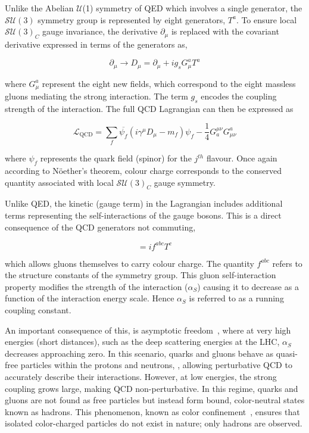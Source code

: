Unlike the Abelian $\mathcal{U}$(1) symmetry of QED which involves a single generator, the $\mathcal{SU}(3)$ symmetry group is represented by eight generators, $T^a$. To ensure local $\mathcal{SU}(3)_C$ gauge invariance, the derivative $\partial_\mu$ is replaced with the covariant derivative expressed in terms of the generators as,

\begin{equation}
    \partial_\mu \rightarrow D_\mu = \partial_\mu + ig_sG^{a}_{\mu}T^{a}
\end{equation}

where $G^{a}_{\mu}$ represent the eight new fields, which correspond to the eight massless gluons mediating the strong interaction. The term $g_s$ encodes the coupling strength of the interaction. The full QCD Lagrangian can then be expressed as

\begin{equation} 
\mathcal{L}_{\text{QCD}} = \sum_{f}\overline{\psi_f}(i\gamma^\mu D_\mu - m_f)\psi_f - \frac{1}{4} G^{\mu\nu}_{a}G^{a}_{\mu\nu}
\end{equation}

where $\psi_f$ represents the quark field (spinor) for the $j^{th}$ flavour. Once again according to N\"{o}ether's theorem, colour charge corresponds to the conserved quantity associated with local $\mathcal{SU}(3)_C$ gauge symmetry.

Unlike QED, the kinetic (gauge term) in the Lagrangian includes additional terms representing the self-interactions of the gauge bosons. This is a direct consequence of the QCD generators not commuting,

\begin{equation}
    [T^a,T^b] = if^{abc}T^c
\end{equation}

which allows gluons themselves to carry colour charge. The quantity $f^{abc}$ refers to the structure constants of the symmetry group. This gluon self-interaction property modifies the strength of the interaction ($\alpha_{S}$) causing it to decrease as a function of the interaction energy scale. Hence $\alpha_{S}$ is referred to as a running coupling constant.

An important consequence of this, is asymptotic freedom~\cite{AsymptoticFreedom_1,AsymptoticFreedom_2}, where at very high energies (short distances), such as the deep scattering energies at the LHC, $\alpha_{S}$ decreases approaching zero. In this scenario, quarks and gluons behave as quasi-free particles within the protons and neutrons, , allowing perturbative QCD to accurately describe their interactions. However, at low energies, the strong coupling grows large, making QCD non-perturbative. In this regime, quarks and gluons are not found as free particles but instead form bound, color-neutral states known as hadrons. This phenomenon, known as color confinement~\cite{MarkThompson}, ensures that isolated color-charged particles do not exist in nature; only hadrons are observed.

